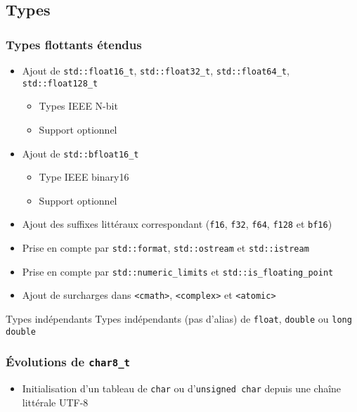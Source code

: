 \documentclass[C++.tex]{subfiles}
\begin{document}
\subsection*{Types}
\begin{frame}[fragile]
	\frametitle{Types flottants étendus}
	\begin{itemize}
		\item Ajout de \lstinline|std::float16_t|, \lstinline|std::float32_t|, \lstinline|std::float64_t|, \lstinline|std::float128_t|
		\begin{itemize}
			\item Types IEEE N-bit
			\item Support optionnel
		\end{itemize}
		\item Ajout de \lstinline|std::bfloat16_t|
		\begin{itemize}
			\item Type IEEE binary16
			\item Support optionnel
		\end{itemize}
		\item Ajout des suffixes littéraux correspondant (\lstinline|f16|, \lstinline|f32|, \lstinline|f64|, \lstinline|f128| et \lstinline|bf16|)
		\item Prise en compte par \lstinline|std::format|, \lstinline|std::ostream| et \lstinline|std::istream|
		\item Prise en compte par \lstinline|std::numeric_limits| et \lstinline|std::is_floating_point|
		\item Ajout de surcharges dans \lstinline|<cmath>|, \lstinline|<complex>| et \lstinline|<atomic>|
	\end{itemize}

	\begin{alertblock}{Types indépendants}
		Types indépendants (pas d'alias) de \lstinline|float|, \lstinline|double| ou \lstinline|long double|
	\end{alertblock}
\end{frame}

\begin{frame}[fragile]
	\frametitle{Évolutions de \lstinline|char8_t|}
	\begin{itemize}
		\item Initialisation d'un tableau de \lstinline|char| ou d'\lstinline|unsigned char| depuis une chaîne littérale UTF-8
	\end{itemize}
\end{frame}
\end{document}
